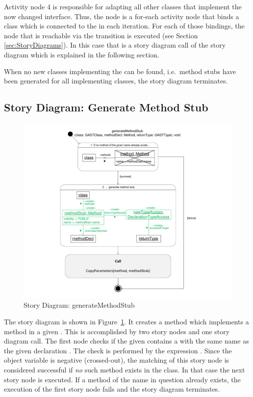 Activity node 4 is responsible for adapting all other classes that implement the now changed interface. Thus, the node is a for-each activity node that binds a class which is connected to the  in each iteration. For each of those bindings, the node that is reachable via the  transition is executed (see Section \ref{sec:StoryDiagrams}). In this case that is a story diagram call of the story diagram  which is explained in the following section.

When no new classes implementing the  can be found, i.e.\ method stubs have been generated for all implementing classes, the story diagram terminates.

\subsection{Story Diagram: Generate Method Stub}

\begin{figure}[hbtp]
\centering
\includegraphics[width=0.9\linewidth]{./figures/SDGenerateMethodStub}
\caption{Story Diagram: generateMethodStub}
\label{fig:SDGenerateMethodStub}
\end{figure}

The story diagram  is shown in Figure~\ref{fig:SDGenerateMethodStub}. It creates a method which implements a method  in a given . This is accomplished by two story nodes and one story diagram call. The first node checks if the given  contains a  with the same name as the given declaration . The check is performed by the expression . Since the object variable  is negative (crossed-out), the matching of this story node is considered successful if \emph{no} such method exists in the class. In that case the next story node is executed. If a method of the name in question already exists, the execution of the first story node fails and the story diagram terminates.

